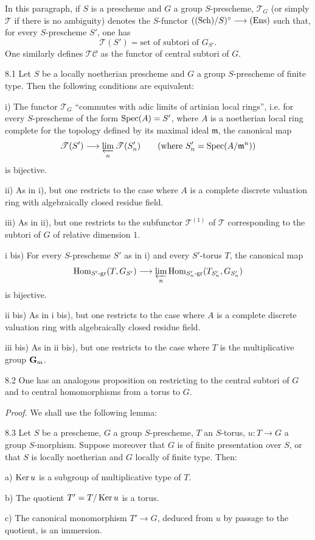 \label{XV.8.0}
In this paragraph, if $S$ is a prescheme and $G$ a group $S$-prescheme, $\mathscr T_G$ (or simply $\mathscr T$ if there is no ambiguity) denotes the $S$-functor $(\textup{(Sch)}/S)^\circ\longrightarrow\textup{(Ens)}$ such that, for every $S$-prescheme $S'$, one has
\[
\mathscr T(S')=\text{set of subtori of }G_{S'}.
\]
One similarly defines $\mathscr{TC}$ as the functor of central subtori of $G$.
\begin{proposition}{8.1}\label{XV.8.1}
Let $S$ be a locally noetherian prescheme and $G$ a group $S$-prescheme of finite type. Then the following conditions are equivalent:

\noindent i) The functor $\mathscr T_G$ ``commutes with adic limits of artinian local rings'', i.e. for every $S$-prescheme of the form $\operatorname{Spec}(A)=S'$, where $A$ is a noetherian local ring complete for the topology defined by its maximal ideal $\mathfrak m$, the canonical map
\[
\mathscr T(S')\longrightarrow\varprojlim_n\mathscr T(S'_n)\qquad(\text{where }S'_n=\operatorname{Spec}(A/\mathfrak m^n))
\]
is bijective.

\noindent ii) As in i), but one restricts to the case where $A$ is a complete discrete valuation ring with algebraically closed residue field.

\noindent iii) As in ii), but one restricts to the subfunctor $\mathscr T^{(1)}$ of $\mathscr T$ corresponding to the subtori of $G$ of relative dimension $1$.

\noindent i bis) For every $S$-prescheme $S'$ as in i) and every $S'$-torus $T$, the canonical map
\[
\operatorname{Hom}_{S'\text{-gr}}(T,G_{S'})\longrightarrow\varprojlim_n\operatorname{Hom}_{S'_n\text{-gr}}(T_{S'_n},G_{S'_n})
\]
is bijective.

\noindent ii bis) As in i bis), but one restricts to the case where $A$ is a complete discrete valuation ring with algebraically closed residue field.

\noindent iii bis) As in ii bis), but one restricts to the case where $T$ is the multiplicative group $\mathbf{G}_{\mathrm{m}}$.
\end{proposition}
\begin{remark}{8.2}\label{XV.8.2}
One has an analogous proposition on restricting to the central subtori of $G$ and to central homomorphisms from a torus to $G$.
\end{remark}
\par\noindent\emph{Proof.}
We shall use the following lemma:
\begin{lemma}{8.3}\label{XV.8.3}
Let $S$ be a prescheme, $G$ a group $S$-prescheme, $T$ an $S$-torus, $u:T\to G$ a group $S$-morphism. Suppose moreover that $G$ is of finite presentation over $S$, or that $S$ is locally noetherian and $G$ locally of finite type. Then:

\noindent a) $\operatorname{Ker} u$ is a subgroup of multiplicative type of $T$.

\noindent b) The quotient $T'=T/\operatorname{Ker} u$ is a torus.

\noindent c) The canonical monomorphism $T'\to G$, deduced from $u$ by passage to the quotient, is an immersion.
\end{lemma}
